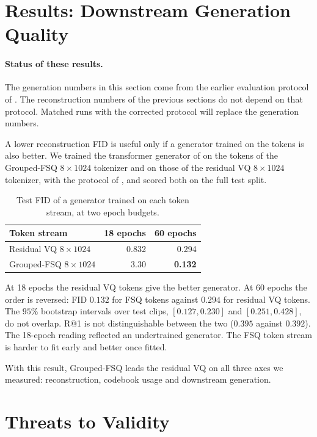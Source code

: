 \section{Results: Downstream Generation Quality}
\label{sec:tok_downstream}

\paragraph{Status of these results.} The generation numbers in this section come from the earlier evaluation protocol of . The reconstruction numbers of the previous sections do not depend on that protocol. Matched runs with the corrected protocol will replace the generation numbers.

A lower reconstruction FID is useful only if a generator trained on the tokens is also better. We trained the transformer generator of  on the tokens of the Grouped-FSQ $8 \times 1024$ tokenizer and on those of the residual VQ $8 \times 1024$ tokenizer, with the protocol of , and scored both on the full test split.

\begin{table}[H]
\centering
\caption{Test FID of a generator trained on each token stream, at two epoch budgets.}
\label{tab:tok_downstream}
\begin{tabular}{lrr}
\toprule
Token stream & 18 epochs & 60 epochs \\
\midrule
Residual VQ $8 \times 1024$ & 0.832 & 0.294 \\
Grouped-FSQ $8 \times 1024$ & 3.30 & \textbf{0.132} \\
\bottomrule
\end{tabular}
\end{table}

At 18 epochs the residual VQ tokens give the better generator. At 60 epochs the order is reversed: FID $0.132$ for FSQ tokens against $0.294$ for residual VQ tokens. The $95\%$ bootstrap intervals over test clips, $[0.127, 0.230]$ and $[0.251, 0.428]$, do not overlap. R@1 is not distinguishable between the two ($0.395$ against $0.392$). The 18-epoch reading reflected an undertrained generator. The FSQ token stream is harder to fit early and better once fitted.

With this result, Grouped-FSQ leads the residual VQ on all three axes we measured: reconstruction, codebook usage and downstream generation.

\section{Threats to Validity}
\label{sec:tok_threats}

